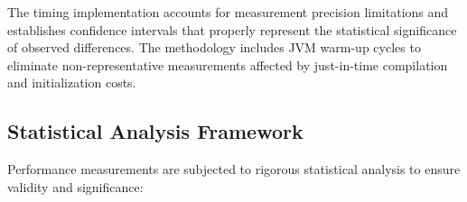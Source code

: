 The timing implementation accounts for measurement precision limitations and establishes confidence intervals that properly represent the statistical significance of observed differences. The methodology includes JVM warm-up cycles to eliminate non-representative measurements affected by just-in-time compilation and initialization costs.

\subsection{Statistical Analysis Framework}

Performance measurements are subjected to rigorous statistical analysis to ensure validity and significance:


